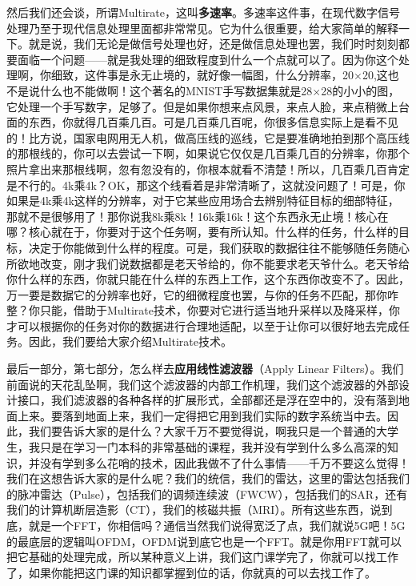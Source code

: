 \documentclass[a4paper,12pt]{article}
\begin{document}
然后我们还会谈，所谓Multirate，这叫\textbf{多速率}。多速率这件事，在现代数字信号处理乃至于现代信息处理里面都非常常见。它为什么很重要，给大家简单的解释一下。就是说，我们无论是做信号处理也好，还是做信息处理也罢，我们时时刻刻都要面临一个问题——就是我处理的细致程度到什么一个点就可以了。因为你这个处理啊，你细致，这件事是永无止境的，就好像一幅图，什么分辨率，20$\times$20,这也不是说什么也不能做啊！这个著名的MNIST手写数据集就是28$\times$28的小小的图，它处理一个手写数字，足够了。但是如果你想来点风景，来点人脸，来点稍微上台面的东西，你就得几百乘几百。可是几百乘几百呢，你很多信息实际上是看不见的！比方说，国家电网用无人机，做高压线的巡线，它是要准确地拍到那个高压线的那根线的，你可以去尝试一下啊，如果说它仅仅是几百乘几百的分辨率，你那个照片拿出来那根线啊，忽有忽没有的，你根本就看不清楚！所以，几百乘几百肯定是不行的。4k乘4k？OK，那这个线看着是非常清晰了，这就没问题了！可是，你如果是4k乘4k这样的分辨率，对于它某些应用场合去辨别特征目标的细部特征，那就不是很够用了！那你说我8k乘8k！16k乘16k！这个东西永无止境！核心在哪？核心就在于，你要对于这个任务啊，要有所认知。什么样的任务，什么样的目标，决定于你能做到什么样的程度。可是，我们获取的数据往往不能够随任务随心所欲地改变，刚才我们说数据都是老天爷给的，你不能要求老天爷什么。老天爷给你什么样的东西，你就只能在什么样的东西上工作，这个东西你改变不了。因此，万一要是数据它的分辨率也好，它的细微程度也罢，与你的任务不匹配，那你咋整？你只能，借助于Multirate技术，你要对它进行适当地升采样以及降采样，你才可以根据你的任务对你的数据进行合理地适配，以至于让你可以很好地去完成任务。因此，我们要给大家介绍Multirate技术。


最后一部分，第七部分，怎么样去\textbf{应用线性滤波器}（Apply Linear Filters）。我们前面说的天花乱坠啊，我们这个滤波器的内部工作机理，我们这个滤波器的外部设计接口，我们滤波器的各种各样的扩展形式，全部都还是浮在空中的，没有落到地面上来。要落到地面上来，我们一定得把它用到我们实际的数字系统当中去。因此，我们要告诉大家的是什么？大家千万不要觉得说，啊我只是一个普通的大学生，我只是在学习一门本科的非常基础的课程，我并没有学到什么多么高深的知识，并没有学到多么花哨的技术，因此我做不了什么事情——千万不要这么觉得！我们在这想告诉大家的是什么呢？我们的统信，我们的雷达，这里的雷达包括我们的脉冲雷达（Pulse），包括我们的调频连续波（FWCW），包括我们的SAR，还有我们的计算机断层造影（CT），我们的核磁共振（MRI）。所有这些东西，说到底，就是一个FFT，你相信吗？通信当然我们说得宽泛了点，我们就说5G吧！5G的最底层的逻辑叫OFDM，OFDM说到底它也是一个FFT。就是你用FFT就可以把它基础的处理完成，所以某种意义上讲，我们这门课学完了，你就可以找工作了，如果你能把这门课的知识都掌握到位的话，你就真的可以去找工作了。
\end{document}
